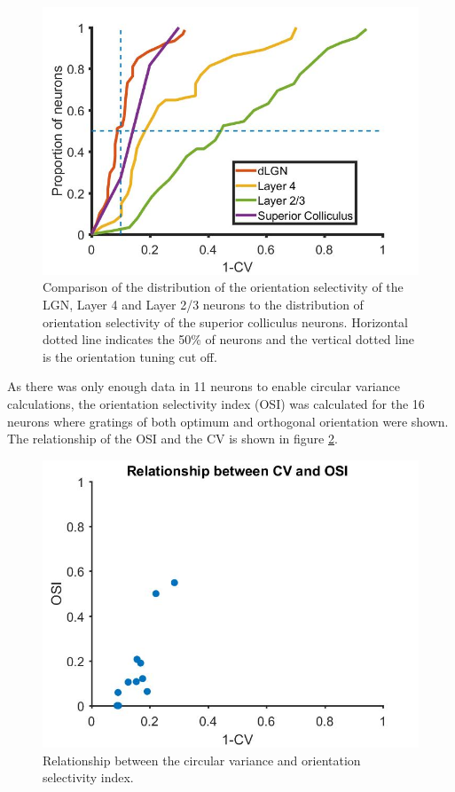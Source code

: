 	\begin{figure}[]
		\includegraphics[width=\linewidth]{superiorcolliculus/orientation_bias_SG_geniculostriate_2.jpg}
		\caption{ Comparison of the distribution of the orientation selectivity of the LGN, Layer 4 and Layer 2/3 neurons to the distribution of orientation selectivity of the superior colliculus neurons. Horizontal dotted line indicates the 50\% of neurons and the vertical dotted line is the orientation tuning cut off.}
		\label{fig:CVvanhooser}			
	\end{figure}
	
	As there was only enough data in 11 neurons to enable circular variance calculations, the orientation selectivity index (OSI) was calculated for the 16 neurons where gratings of both optimum and orthogonal orientation were shown. The relationship of the OSI and the CV is shown in figure \ref{fig:CVvOSI}. 
	
		\begin{figure}[]
		\includegraphics[width=\linewidth]{superiorcolliculus/CVvsOSI.jpg}
		\caption{Relationship between the circular variance and orientation selectivity index.}
		\label{fig:CVvOSI}			
	\end{figure}
	
